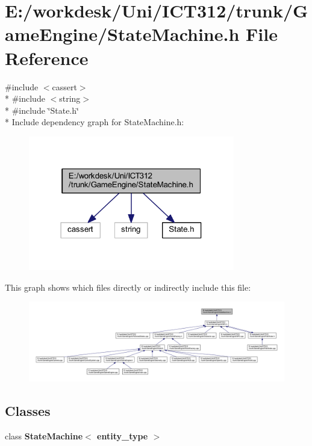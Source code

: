 \section{E\+:/workdesk/\+Uni/\+I\+C\+T312/trunk/\+Game\+Engine/\+State\+Machine.h File Reference}
\label{_state_machine_8h}
{\ttfamily \#include $<$cassert$>$}\\*
{\ttfamily \#include $<$string$>$}\\*
{\ttfamily \#include \char`\"{}State.\+h\char`\"{}}\\*
Include dependency graph for State\+Machine.\+h\+:\nopagebreak
\begin{figure}[H]
\begin{center}
\leavevmode
\includegraphics[width=255pt]{d5/d3f/_state_machine_8h__incl}
\end{center}
\end{figure}
This graph shows which files directly or indirectly include this file\+:
\nopagebreak
\begin{figure}[H]
\begin{center}
\leavevmode
\includegraphics[width=350pt]{df/d77/_state_machine_8h__dep__incl}
\end{center}
\end{figure}
\subsection*{Classes}
\begin{DoxyCompactItemize}
\item 
class {\bf State\+Machine$<$ entity\+\_\+type $>$}
\end{DoxyCompactItemize}
